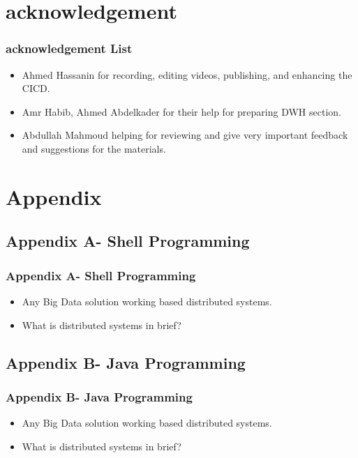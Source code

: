 \section{acknowledgement}
\begin{frame}
	\frametitle{acknowledgement List}
	\begin{itemize}[<+->]
		\item Ahmed Hassanin for recording, editing videos, publishing, and enhancing the CICD.
		\item Amr Habib, Ahmed Abdelkader for their help for preparing DWH section.
		\item Abdullah Mahmoud helping for reviewing and give very important feedback and suggestions for the materials.
	\end{itemize}
\end{frame}


\section{Appendix}
          
\subsection{Appendix A- Shell Programming}  
\begin{frame}
\frametitle{Appendix A- Shell Programming}
\begin{itemize}[<+->]
	\item Any Big Data solution working based distributed systems.
	\item What is distributed systems in brief?
\end{itemize}
\end{frame}

\subsection{Appendix B- Java Programming}   
\begin{frame}
\frametitle{Appendix B- Java Programming}
\begin{itemize}[<+->]
	\item Any Big Data solution working based distributed systems.
	\item What is distributed systems in brief?
\end{itemize}
\end{frame}

